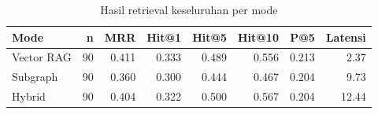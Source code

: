 \begin{table}[htbp]
    \centering
    \small
    \caption{Hasil retrieval keseluruhan per mode}
    \label{tab:bab4-retrieval-overall}
    \begin{tabular}{lrrrrrrr}
        \toprule
        Mode & n & MRR & Hit@1 & Hit@5 & Hit@10 & P@5 & Latensi \\
        \midrule
        Vector RAG & 90 & 0.411 & 0.333 & 0.489 & 0.556 & 0.213 & 2.37 \\
        Subgraph & 90 & 0.360 & 0.300 & 0.444 & 0.467 & 0.204 & 9.73 \\
        Hybrid & 90 & 0.404 & 0.322 & 0.500 & 0.567 & 0.204 & 12.44 \\
        \bottomrule
    \end{tabular}
\end{table}
